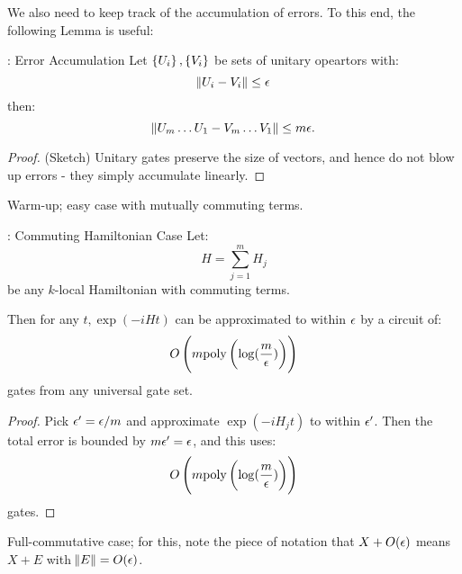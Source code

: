 We also need to keep track of the accumulation of errors. To this end, the following Lemma is useful:
\begin{lembox}{: Error Accumulation}
    Let $\set{U_i}, \set{V_i}$ be sets of unitary opeartors with:
    \begin{equation}
        \norm{U_i - V_i} \leq \epsilon
    \end{equation}
    then:
    \begin{equation}
        \norm{U_m\ldots U_1 - V_m \ldots V_1} \leq m\epsilon.
    \end{equation}
\end{lembox}
\begin{proof}
    (Sketch) Unitary gates preserve the size of vectors, and hence do not blow up errors - they simply accumulate linearly.
\end{proof}

Warm-up; easy case with mutually commuting terms.

\begin{propbox}{: Commuting Hamiltonian Case}
    Let:
    \begin{equation}
        H = \sum_{j=1}^m H_j
    \end{equation}
    be any $k$-local Hamiltonian with commuting terms.

    Then for any $t, \exp(-iHt)$ can be approximated to within $\epsilon$ by a circuit of:
    \begin{equation}
        O\left(m\text{poly}\left(\log(\frac{m}{\epsilon})\right)\right)
    \end{equation}
    gates from any universal gate set.
\end{propbox}
\begin{proof}
    Pick $\epsilon' = \epsilon/m$ and approximate $\exp(-iH_jt)$ to within $\epsilon'$. Then the total error is bounded by $m\epsilon' = \epsilon$, and this uses:
    \begin{equation}
        O\left(m\text{poly}\left(\log(\frac{m}{\epsilon})\right)\right)
    \end{equation}
    gates.
\end{proof}
Full-commutative case; for this, note the piece of notation that $X + O(\epsilon)$ means $X + E$ with $\norm{E} = O(\epsilon)$. 

